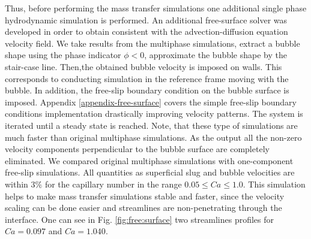\documentclass{article}
\begin{document}
\begin{description}
Thus, before performing the mass transfer simulations one additional single phase hydrodynamic
simulation is performed. An additional free-surface solver was developed in order to obtain
consistent with the advection-diffusion equation velocity field. We take results from the
multiphase simulations, extract a
bubble shape using the phase indicator $\phi<0$, approximate the bubble shape by the stair-case
line. Then,the obtained bubble velocity is imposed on walls. This corresponds to conducting
simulation in the reference frame moving with the bubble. In addition, the free-slip boundary
condition on the bubble surface is imposed. Appendix \ref{appendix-free-surface} covers the simple
free-slip boundary conditions implementation drastically improving velocity patterns. The system is
iterated until a
steady state is reached. Note, that these type of simulations are much faster than original
multiphase simulations. As the output all the non-zero velocity components perpendicular to the
bubble surface are completely eliminated. We compared original multiphase simulations with
one-component free-slip simulations. All quantities as superficial slug and bubble velocities are
within $3\%$ for the capillary number in the range $0.05\leq Ca \leq 1.0$. This simulation helps to
make mass transfer simulations stable and faster, since the velocity scaling can be done easier and
streamlines are non-penetrating through the interface. One
can see in Fig. \ref{fig:free:surface} two streamlines profiles for $Ca=0.097$  and $Ca=1.040$.
\begin{figure}[htb!]

\end{figure}
\end{description}
\end{document}
